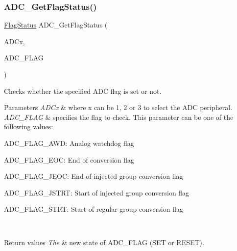 \subsubsection{\texorpdfstring{ADC\_GetFlagStatus()}{ADC\_GetFlagStatus()}}
{\footnotesize\ttfamily \mbox{\hyperlink{group___exported__types_ga89136caac2e14c55151f527ac02daaff}{Flag\+Status}} A\+D\+C\+\_\+\+Get\+Flag\+Status (\begin{DoxyParamCaption}\item[{\mbox{\hyperlink{struct_a_d_c___type_def}{A\+D\+C\+\_\+\+Type\+Def}} $\ast$}]{A\+D\+Cx,  }\item[{uint8\+\_\+t}]{A\+D\+C\+\_\+\+F\+L\+AG }\end{DoxyParamCaption})}



Checks whether the specified A\+DC flag is set or not. 


\begin{DoxyParams}{Parameters}
{\em A\+D\+Cx} & where x can be 1, 2 or 3 to select the A\+DC peripheral. \\
\hline
{\em A\+D\+C\+\_\+\+F\+L\+AG} & specifies the flag to check. This parameter can be one of the following values\+: \begin{DoxyItemize}
\item A\+D\+C\+\_\+\+F\+L\+A\+G\+\_\+\+A\+WD\+: Analog watchdog flag \item A\+D\+C\+\_\+\+F\+L\+A\+G\+\_\+\+E\+OC\+: End of conversion flag \item A\+D\+C\+\_\+\+F\+L\+A\+G\+\_\+\+J\+E\+OC\+: End of injected group conversion flag \item A\+D\+C\+\_\+\+F\+L\+A\+G\+\_\+\+J\+S\+T\+RT\+: Start of injected group conversion flag \item A\+D\+C\+\_\+\+F\+L\+A\+G\+\_\+\+S\+T\+RT\+: Start of regular group conversion flag \end{DoxyItemize}
\\
\hline
\end{DoxyParams}

\begin{DoxyRetVals}{Return values}
{\em The} & new state of A\+D\+C\+\_\+\+F\+L\+AG (S\+ET or R\+E\+S\+ET). \\
\hline
\end{DoxyRetVals}
\mbox{\label{group___a_d_c___private___functions_ga1dea5ed24571a2e0ce4cbd41c9c1ec46}} 
